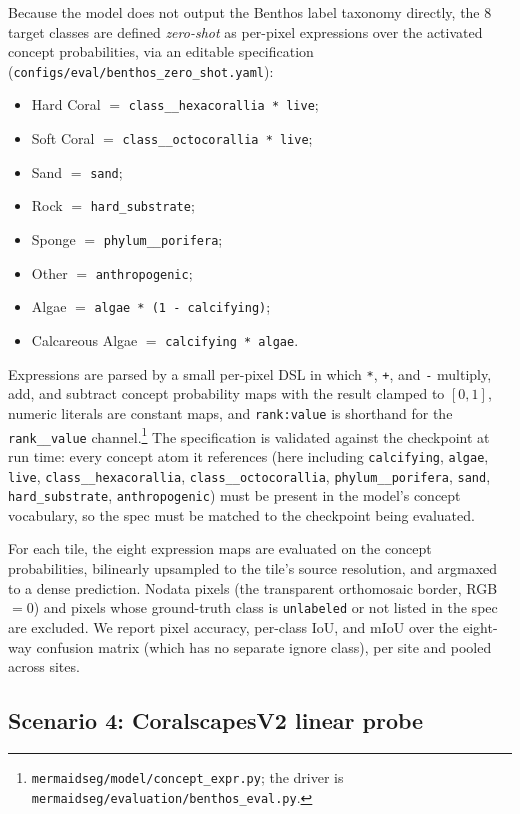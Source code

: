 Because the model does not output the Benthos label taxonomy directly, the
$8$ target classes are defined \emph{zero-shot} as per-pixel expressions over the
activated concept probabilities, via an editable specification
(\texttt{configs/eval/benthos\_zero\_shot.yaml}):
\begin{itemize}
\item Hard Coral $=$ \texttt{class\_\_hexacorallia * live};
\item Soft Coral $=$ \texttt{class\_\_octocorallia * live};
\item Sand $=$ \texttt{sand};
\item Rock $=$ \texttt{hard\_substrate};
\item Sponge $=$ \texttt{phylum\_\_porifera};
\item Other $=$ \texttt{anthropogenic};
\item Algae $=$ \texttt{algae * (1 - calcifying)};
\item Calcareous Algae $=$ \texttt{calcifying * algae}.
\end{itemize}
Expressions are parsed by a small per-pixel DSL in which \texttt{*}, \texttt{+},
and \texttt{-} multiply, add, and subtract concept probability maps with the
result clamped to $[0,1]$, numeric literals are constant maps, and
\texttt{rank:value} is shorthand for the \texttt{rank\_\_value} channel.\footnote{%
\texttt{mermaidseg/model/concept\_expr.py}; the driver is
\texttt{mermaidseg/evaluation/benthos\_eval.py}.} The specification is validated
against the checkpoint at run time: every concept atom it references (here
including \texttt{calcifying}, \texttt{algae}, \texttt{live},
\texttt{class\_\_hexacorallia}, \texttt{class\_\_octocorallia},
\texttt{phylum\_\_porifera}, \texttt{sand}, \texttt{hard\_substrate},
\texttt{anthropogenic}) must be present in the model's concept vocabulary, so the
spec must be matched to the checkpoint being evaluated.

For each tile, the eight expression maps are evaluated on the concept
probabilities, bilinearly upsampled to the tile's source resolution, and
argmaxed to a dense prediction. Nodata pixels (the transparent orthomosaic
border, RGB $=0$) and pixels whose ground-truth class is \texttt{unlabeled} or
not listed in the spec are excluded. We report pixel accuracy, per-class IoU,
and mIoU over the eight-way confusion matrix (which has no separate ignore
class), per site and pooled across sites.

\subsection{Scenario 4: CoralscapesV2 linear probe}
\label{sec:eval-coralscapes}

